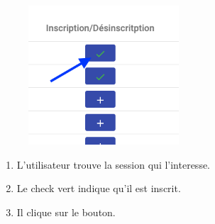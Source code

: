 \begin{figure}[h]
	\includegraphics[width=0.5\textwidth,center]{Figures/us5-1}
\end{figure}

\begin{enumerate}
	\item L'utilisateur trouve la session qui l'interesse.
	\item Le check vert indique qu'il est inscrit.
	\item Il clique sur le bouton.
\end{enumerate}